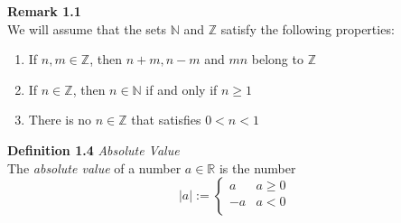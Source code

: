 \documentclass[8pt,landscape]{article}
\begin{document}
\begin{multicols}{3}

    \textbf{Remark 1.1} \\
    We will assume that the sets $\mathbb{N}$ and $\mathbb{Z}$ satisfy the following
    properties:
    \begin{enumerate}
        \item If $n, m \in \mathbb{Z}$, then $n + m, n - m$ and $mn$ belong to $\mathbb{Z}$
        \item If $n \in \mathbb{Z}$, then $n \in \mathbb{N}$ if and only if $n \geq 1$
        \item There is no $n \in \mathbb{Z}$ that satisfies $0 < n < 1$
    \end{enumerate}

    \textbf{Definition 1.4} \emph{Absolute Value} \\
    The \emph{absolute value} of a number $a \in \mathbb{R}$ is the number
    \[
        |a| :=
        \begin{cases}{}
            a  & a \geq 0 \\
            -a & a < 0 \\
        \end{cases}
    \]


\end{multicols}
\end{document}
